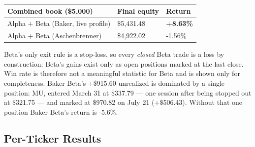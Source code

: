 \documentclass[11pt]{article}
\begin{document}
{\def\LTcaptype{none} %
{\small
\begin{longtable}{@{}lll@{}}
\toprule\noalign{}
Combined book (\$5,000) & Final equity & Return \\
\midrule\noalign{}
\endhead
\bottomrule\noalign{}
\endlastfoot
\renewcommand{\arraystretch}{1.15}
Alpha + Beta (Baker, live profile) & \$5,431.48 & \textbf{+8.63\%} \\
Alpha + Beta (Aschenbrenner) & \$4,922.02 & -1.56\% \\
\end{longtable}}
}

Beta's only exit rule is a stop-loss, so every \emph{closed} Beta trade is a loss by construction; Beta's gains exist only as open positions marked at the last close. Win rate is therefore not a meaningful statistic for Beta and is shown only for completeness. Baker Beta's +\$915.60 unrealized is dominated by a single position: MU, entered March 31 at \$337.79 --- one session after being stopped out at \$321.75 --- and marked at \$970.82 on July 21 (+\$506.43). Without that one position Baker Beta's return is -5.6\%.

\subsection{Per-Ticker Results}\label{per-ticker-results}
\end{document}
